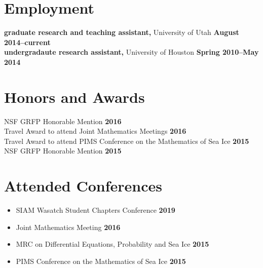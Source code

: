 \documentclass[margin,line]{res}
\begin{document}
\begin{resume}
\section{\sc Employment}
{\bf graduate research and teaching assistant,} University of Utah \hfill {\bf August 2014--current}\\
{\bf undergradaute research assistant,} University of Houston \hfill {\bf Spring 2010--May 2014}\\

\section{\sc Honors and Awards}
{NSF GRFP Honorable Mention} \hfill {\bf 2016}\\
{Travel Award to attend Joint Mathematics Meetings} \hfill {\bf 2016}\\
{Travel Award to attend PIMS Conference on the Mathematics of Sea Ice} \hfill {\bf 2015}\\
{NSF GRFP Honorable Mention} \hfill {\bf 2015}

\ifx\nopubs\undefined

\else
\fi

\section{\sc Attended Conferences}
\begin{itemize}
\item[] SIAM Wasatch Student Chapters Conference
\hfill {\bf 2019}
\item[] Joint Mathematics Meeting
\hfill {\bf 2016}
\item[] MRC on Differential Equations, Probability and Sea Ice
\hfill {\bf 2015}
\item[] PIMS Conference on the Mathematics of Sea Ice
\hfill {\bf 2015}
\end{itemize}


\end{resume}
\end{document}
